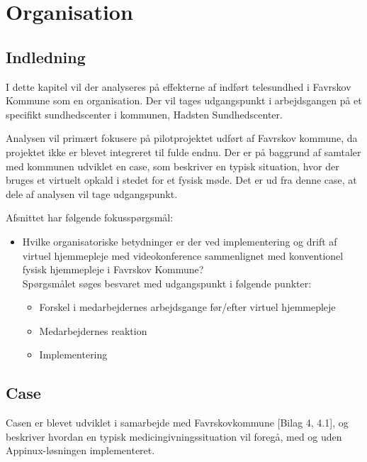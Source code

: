 \chapter{Organisation}

\section{Indledning}
I dette kapitel vil der analyseres på effekterne af indført telesundhed i Favrskov Kommune som en organisation. Der vil tages udgangspunkt i arbejdsgangen på et specifikt sundhedscenter i kommunen, Hadsten Sundhedscenter. 

Analysen vil primært fokusere på pilotprojektet udført af Favrskov kommune, da projektet ikke er blevet integreret til fulde endnu. Der er på baggrund af samtaler med kommunen udviklet en case, som beskriver en typisk situation, hvor der bruges et virtuelt opkald i stedet for et fysisk møde. Det er ud fra denne case, at dele af analysen vil tage udgangspunkt.

Afsnittet har følgende fokusspørgsmål:
\begin{itemize}
	\item Hvilke organisatoriske betydninger er der ved implementering og drift af virtuel hjemmepleje med videokonference sammenlignet med konventionel fysisk hjemmepleje i Favrskov Kommune? \\Spørgsmålet søges besvaret med udgangspunkt i følgende punkter:
	\begin{itemize}
	\item Forskel i medarbejdernes arbejdsgange før/efter virtuel hjemmepleje
	\item Medarbejdernes reaktion
	\item Implementering
\end{itemize}
\end{itemize}

\section{Case}
Casen er blevet udviklet i samarbejde med Favrskovkommune [Bilag 4, 4.1], og beskriver hvordan en typisk medicingivningssituation vil foregå, med og uden Appinux-løsningen implementeret. 

